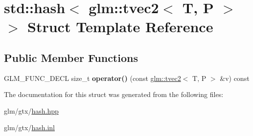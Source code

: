\hypertarget{structstd_1_1hash_3_01glm_1_1tvec2_3_01T_00_01P_01_4_01_4}{\section{std\-:\-:hash$<$ glm\-:\-:tvec2$<$ T, P $>$ $>$ Struct Template Reference}
\label{structstd_1_1hash_3_01glm_1_1tvec2_3_01T_00_01P_01_4_01_4}
}
\subsection*{Public Member Functions}
\begin{DoxyCompactItemize}
\item 
\hypertarget{structstd_1_1hash_3_01glm_1_1tvec2_3_01T_00_01P_01_4_01_4_a4bb0f8c52a9d91531ce536c7ed1770a0}{G\-L\-M\-\_\-\-F\-U\-N\-C\-\_\-\-D\-E\-C\-L size\-\_\-t {\bfseries operator()} (const \hyperlink{structglm_1_1tvec2}{glm\-::tvec2}$<$ T, P $>$ \&v) const }\label{structstd_1_1hash_3_01glm_1_1tvec2_3_01T_00_01P_01_4_01_4_a4bb0f8c52a9d91531ce536c7ed1770a0}

\end{DoxyCompactItemize}


The documentation for this struct was generated from the following files\-:\begin{DoxyCompactItemize}
\item 
glm/gtx/\hyperlink{hash_8hpp}{hash.\-hpp}\item 
glm/gtx/\hyperlink{hash_8inl}{hash.\-inl}\end{DoxyCompactItemize}
